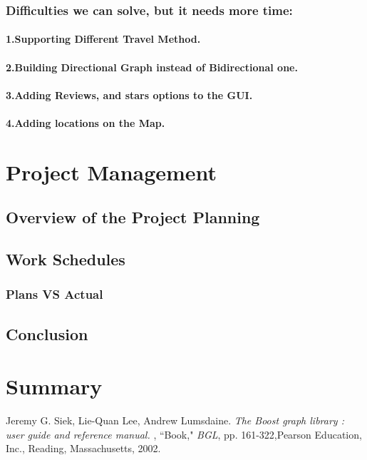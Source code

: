 \documentclass[a4paper,english]{book}
\begin{document}
\subsection{Difficulties we can solve, but it needs more time:}
\subsubsection{1.Supporting Different Travel Method.}
\subsubsection{2.Building Directional Graph instead of Bidirectional one.}
\subsubsection{3.Adding Reviews, and stars options to the GUI.}
\subsubsection{4.Adding locations on the Map.}
\chapter{Project Management}
\section{Overview of the Project Planning}
\section{Work Schedules}
\subsection{Plans VS Actual}
\section{Conclusion}
\chapter{Summary}
\begin{thebibliography}{12}
Jeremy G. Siek,
Lie-Quan Lee, Andrew Lumsdaine.
\textit{The Boost graph library : user guide and reference manual.} , ``Book," \emph{BGL}, pp. 161-322,Pearson Education, Inc., Reading, Massachusetts, 2002.
\end{thebibliography}
\end{document}
